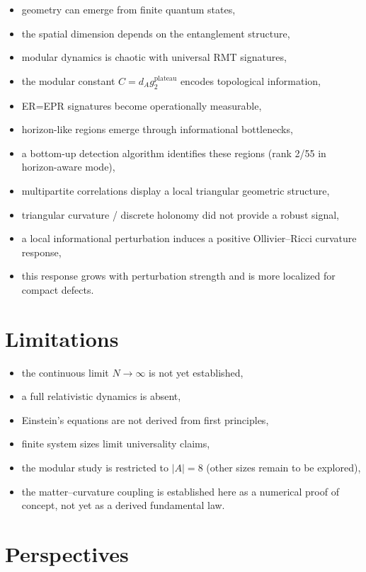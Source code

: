 \documentclass[11pt]{article}
\begin{document}
\begin{itemize}
\item geometry can emerge from finite quantum states,
\item the spatial dimension depends on the entanglement structure,
\item modular dynamics is chaotic with universal RMT signatures,
\item the modular constant $C=d_A g_2^{\mathrm{plateau}}$ encodes topological information,
\item ER=EPR signatures become operationally measurable,
\item horizon-like regions emerge through informational bottlenecks,
\item a bottom-up detection algorithm identifies these regions (rank 2/55 in horizon-aware mode),
\item multipartite correlations display a local triangular geometric structure,
\item triangular curvature / discrete holonomy did not provide a robust signal,
\item a local informational perturbation induces a positive Ollivier--Ricci curvature response,
\item this response grows with perturbation strength and is more localized for compact defects.
\end{itemize}

\section{Limitations}

\begin{itemize}
\item the continuous limit $N\rightarrow\infty$ is not yet established,
\item a full relativistic dynamics is absent,
\item Einstein's equations are not derived from first principles,
\item finite system sizes limit universality claims,
\item the modular study is restricted to $|A|=8$ (other sizes remain to be explored),
\item the matter--curvature coupling is established here as a numerical proof of concept, not yet as a derived fundamental law.
\end{itemize}

\section{Perspectives}
\end{document}
